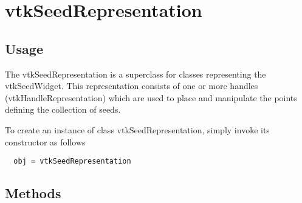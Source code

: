 \section{vtkSeedRepresentation}

\subsection{Usage}

 The vtkSeedRepresentation is a superclass for classes representing the
 vtkSeedWidget. This representation consists of one or more handles
 (vtkHandleRepresentation) which are used to place and manipulate the
 points defining the collection of seeds. 

To create an instance of class vtkSeedRepresentation, simply
invoke its constructor as follows
\begin{verbatim}
  obj = vtkSeedRepresentation
\end{verbatim}
\subsection{Methods}

